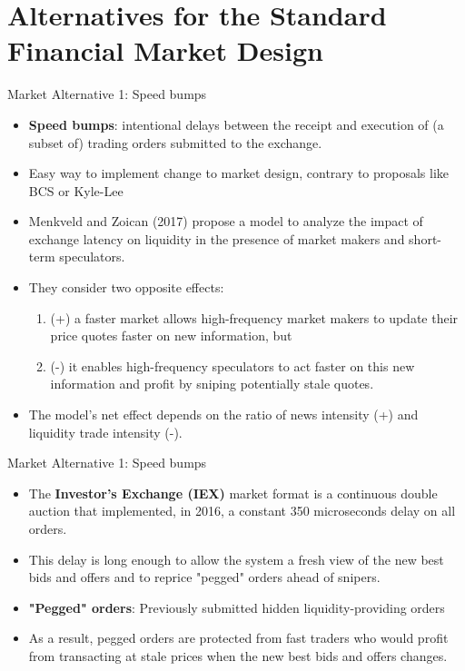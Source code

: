 \documentclass{beamer}
\begin{document}

\section{Alternatives for the Standard Financial Market Design}

\begin{frame}{Market Alternative 1: Speed bumps}

\begin{itemize}
    \item \textbf{Speed bumps}: intentional delays between the receipt and execution of (a subset of) trading orders submitted to the exchange.
    \item Easy way to implement change to market design, contrary to proposals like BCS or Kyle-Lee
    \item Menkveld and Zoican (2017) propose a model to analyze the impact of exchange latency on liquidity in the presence of market makers and short-term speculators.
    \item They consider two opposite effects:
    \begin{enumerate}
        \item (+) a faster market allows high-frequency market makers to update their price quotes faster on new information, but
        \item (-) it enables high-frequency speculators to act faster on this new information and profit by sniping potentially stale quotes.
    \end{enumerate}
    \item The model's net effect depends on the ratio of news intensity (+) and liquidity trade intensity (-).
\end{itemize}

\end{frame}

\begin{frame}{Market Alternative 1: Speed bumps}

\begin{itemize}
    \item The \textbf{Investor's Exchange (IEX)} market format is a continuous double auction that implemented, in 2016, a constant 350 microseconds delay on all orders.
    \item This delay is long enough to allow the system a fresh view of the new best bids and offers and to reprice "pegged" orders ahead of snipers.
    \item \textbf{"Pegged" orders}: Previously submitted hidden liquidity-providing orders
    \item As a result, pegged orders are protected from fast traders who would profit from transacting at stale prices when the new best bids and offers changes.
\end{itemize}

\end{frame}
\end{document}
